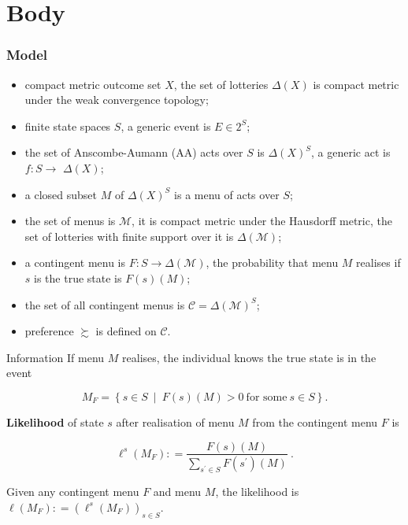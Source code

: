 \documentclass[usenames,dvipsnames,aspectratio=169,11pt, envcountsect, handout]{beamer}
\begin{document}
\section{Body}

\begin{frame}\frametitle{Model}
	\begin{itemize}
		\item
		      compact metric outcome set \(X\), the set of lotteries \(\Delta(X)\) is compact metric under the weak convergence topology; \pause
		\item
		      finite state spaces \(S\), a generic event is \( E \in 2^{S} \); \pause
		\item
		      the set of Anscombe-Aumann (AA) acts over \(S\) is \(\Delta(X)^{S}\), a generic act is \(f: S \longrightarrow\) \(\Delta(X)\); \pause
		\item
		      a closed subset \(M\) of \(\Delta \left( X \right)^{S}\) is a menu of acts over \(S\); \pause
		\item
		      the set of menus is \(\mathcal{M}\), it is compact metric under the Hausdorff metric, the set of lotteries with finite support over it is \(\Delta(\mathcal{M})\); \pause
		\item
		      a contingent menu is \(F: S \rightarrow \Delta \left( \mathcal{M} \right) \), the probability that menu \( M \) realises if \(s\) is the true state is \(F\left( s \right) \left( M \right) \); \pause
		\item
		      the set of all contingent menus is \(\mathcal{C}= \Delta \left( \mathcal{M} \right)^S \); \pause
		\item
		      preference \(\succsim\) is defined on \( \mathcal{C} \).

	\end{itemize}
\end{frame}

\begin{frame}{Information}
	If menu \(M\) realises, the individual knows the true state is in the event

	\[
		M_{F} = \left\{ s \in S \: \mid \: F\left( s \right) \left( M \right) > 0 \: \text{for some} \: s \in S \right\} .
	\] \pause

	\vfill

	\textbf{Likelihood} of state \(s\) after realisation of menu \(M\) from the contingent menu \(F\) is

	\[
		\ell^s \left(M_{F} \right) : = \frac{F\left( s \right) \left( M \right)}{ \sum_{s^{\prime} \in S} F\left( s^{\prime} \right) \left( M \right)} \: .
	\]

	\vfill

	Given any contingent menu \(F\) and menu \(M\), the likelihood is \(\ell \left( M_{F} \right) : = \left( \ell^s \left(M_{F} \right) \right)_{s \in S}\).
\end{frame}
\end{document}
